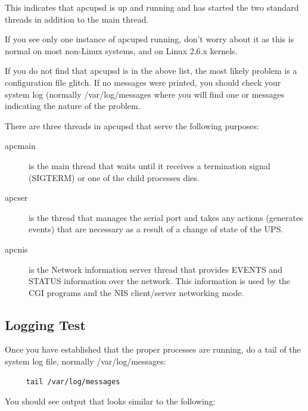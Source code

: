 This indicates that apcupsd is up and running and has started the
two standard threads in addition to the main thread.

If you see only one instance of apcupsd running, don't worry about it as this
is normal on most non-Linux systems, and on Linux 2.6.x kernels.  

If you do not find that apcupsd is in the above list, the most likely problem
is a configuration file glitch.  If no messages were printed, you should check
your system log (normally /var/log/messages where you will find one or
messages indicating the nature of the problem. 

There are three threads in apcupsd that serve the following purposes:

\begin{description}

\item [apcmain]
   is the main thread that waits until it receives a termination signal
(SIGTERM) or one of the child processes dies.  

\item [apcser]
   is the thread that manages the serial port and takes any actions (generates
events) that are necessary as a result of a change of state of the UPS.  

\item [apcnis]
   is the Network information server thread that provides EVENTS and STATUS
information over the network. This information is used by the CGI programs
and the NIS client/server networking mode. 
\end{description}


\label{Logging-Test}

\subsection*{Logging Test}

\label{index-Testing_002c-Logging-87}
\label{index-Logging_002c-Testing-88}
Once you have established that the proper processes are running, do a tail of
the system log file, normally /var/log/messages: 

\footnotesize
\begin{verbatim}
     tail /var/log/messages
\end{verbatim}
\normalsize

You should see output that looks similar to the following: 

